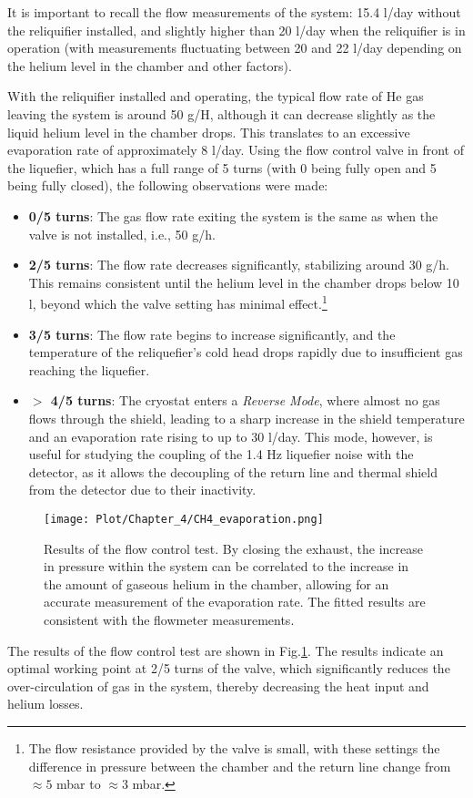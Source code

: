 \documentclass[12pt,a4paper]{report}
\begin{document}
        It is important to recall the flow measurements of the system: 15.4 l/day without the reliquifier installed, and slightly higher than 20 l/day when the reliquifier is in operation (with measurements fluctuating between 20 and 22 l/day depending on the helium level in the chamber and other factors).
        
        With the reliquifier installed and operating, the typical flow rate of He gas leaving the system is around 50 g/H, although it can decrease slightly as the liquid helium level in the chamber drops. This translates to an excessive evaporation rate of approximately 8 l/day. Using the flow control valve in front of the liquefier, which has a full range of 5 turns (with 0 being fully open and 5 being fully closed), the following observations were made:
        
        \begin{itemize}
        	\item \textbf{0/5 turns}: The gas flow rate exiting the system is the same as when the valve is not installed, i.e., 50 g/h.
        	\item \textbf{2/5 turns}: The flow rate decreases significantly, stabilizing around 30 g/h. This remains consistent until the helium level in the chamber drops below 10 l, beyond which the valve setting has minimal effect.\footnote{The flow resistance provided by the valve is small, with these settings the difference in pressure between the chamber and the return line change from $\approx 5$ mbar to $\approx 3$ mbar.}
        	\item \textbf{3/5 turns}: The flow rate begins to increase significantly, and the temperature of the reliquefier's cold head drops rapidly due to insufficient gas reaching the liquefier.
        	\item \textbf{$>$ 4/5 turns}: The cryostat enters a \textit{Reverse Mode}, where almost no gas flows through the shield, leading to a sharp increase in the shield temperature and an evaporation rate rising to up to 30 l/day. This mode, however, is useful for studying the coupling of the 1.4 Hz liquefier noise with the detector, as it allows the decoupling of the return line and thermal shield from the detector due to their inactivity.
        \end{itemize}
        \begin{figure}[H]
        	\centering
        	\texttt{[image: Plot/Chapter\_4/CH4\_evaporation.png]}
        	\caption{\small{Results of the flow control test. By closing the exhaust, the increase in pressure within the system can be correlated to the increase in the amount of gaseous helium in the chamber, allowing for an accurate measurement of the evaporation rate. The fitted results are consistent with the flowmeter measurements.}}
        	\label{CH4_flow_control}
        \end{figure}
        The results of the flow control test are shown in Fig.\ref{CH4_flow_control}. The results indicate an optimal working point at 2/5 turns of the valve, which significantly reduces the over-circulation of gas in the system, thereby decreasing the heat input and helium losses.
\end{document}
